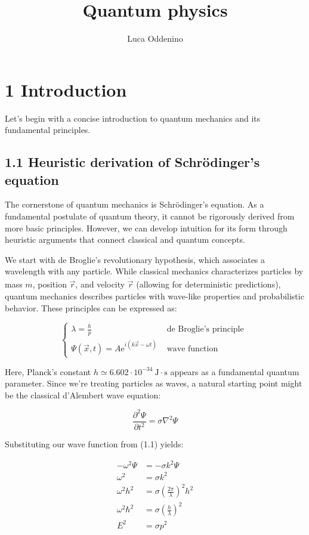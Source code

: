 \documentclass[italian]{HKNdocument}
\title{Quantum physics}
\author{Luca Oddenino}
\begin{document}
\frontmatter
\maketitle

\tableofcontents
\clearpage
\mainmatter

\section*{1 Introduction}
Let's begin with a concise introduction to quantum mechanics and its fundamental principles.

\subsection*{1.1 Heuristic derivation of Schrödinger's equation}
The cornerstone of quantum mechanics is Schrödinger's equation. As a fundamental postulate of quantum theory, it cannot be rigorously derived from more basic principles. However, we can develop intuition for its form through heuristic arguments that connect classical and quantum concepts.

We start with de Broglie's revolutionary hypothesis, which associates a wavelength with any particle. While classical mechanics characterizes particles by mass $m$, position $\vec{r}$, and velocity $\dot{\vec{r}}$ (allowing for deterministic predictions), quantum mechanics describes particles with wave-like properties and probabilistic behavior. These principles can be expressed as:

\[
\begin{cases}\lambda=\frac{h}{p} & \text { de Broglie's principle }  \tag{1.1}\\ \Psi(\vec{x}, t)=A \mathrm{e}^{i(k \vec{x}-\omega t)} & \text { wave function }\end{cases}
\]

Here, Planck's constant $h \simeq 6.602 \cdot 10^{-34} \mathrm{~J} \cdot \mathrm{s}$ appears as a fundamental quantum parameter. Since we're treating particles as waves, a natural starting point might be the classical d'Alembert wave equation:

\begin{equation*}
\frac{\partial^{2} \Psi}{\partial t^{2}}=\sigma \nabla^{2} \Psi \tag{1.2}
\end{equation*}

Substituting our wave function from (1.1) yields:

\begin{align*}
-\omega^{2} \Psi & =-\sigma k^{2} \Psi \\
\omega^{2} & =\sigma k^{2} \\
\omega^{2} h^{2} & =\sigma\left(\frac{2 \pi}{\lambda}\right)^{2} h^{2}  \tag{1.3}\\
\omega^{2} \hbar^{2} & =\sigma\left(\frac{h}{\lambda}\right)^{2} \\
E^{2} & =\sigma p^{2}
\end{align*}
\end{document}
